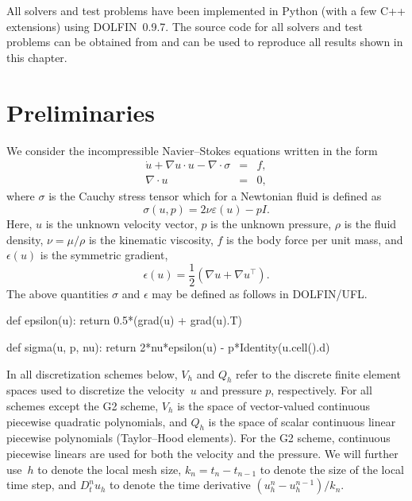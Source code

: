 All solvers and test problems have been implemented in Python (with a
few C++ extensions) using DOLFIN~0.9.7. The source code for all
solvers and test problems can be obtained from
 and can be used to reproduce all
results shown in this chapter.

\section{Preliminaries}

We consider the incompressible Navier--Stokes equations written in the
form
\begin{eqnarray}
  \label{eq:ns,mom}
  \dot{u} + \nabla u \cdot u - \nabla \cdot \sigma  &=& f, \\
  \label{eq:ns,con}
  \nabla \cdot u &=& 0,
\end{eqnarray}
where $\sigma$ is the Cauchy stress tensor which for a Newtonian fluid
is defined as
\begin{equation*}
  \sigma(u,p) = 2\nu\varepsilon(u) - pI.
\end{equation*}
Here, $u$ is the unknown velocity vector, $p$ is the unknown pressure,
$\rho$ is the fluid density, $\nu = \mu / \rho$ is the kinematic
viscosity, $f$ is the body force per unit mass, and $\epsilon(u)$ is
the symmetric gradient,
\begin{equation*}
  \epsilon(u) = \frac{1}{2} (\nabla u + \nabla u^{\top}).
\end{equation*}
The above quantities $\sigma$ and $\epsilon$ may be defined as follows
in DOLFIN/UFL.
\begin{python}
def epsilon(u):
    return 0.5*(grad(u) + grad(u).T)
\end{python}
\begin{python}
def sigma(u, p, nu):
    return 2*nu*epsilon(u) - p*Identity(u.cell().d)
\end{python}

In all discretization schemes below, $V_h$ and $Q_h$ refer to the
discrete finite element spaces used to discretize the velocity~$u$ and
pressure $p$, respectively. For all schemes except the G2 scheme,
$V_h$ is the space of vector-valued continuous piecewise quadratic
polynomials, and $Q_h$ is the space of scalar continuous linear
piecewise polynomials (Taylor--Hood elements). For the G2 scheme,
continuous piecewise linears are used for both the velocity and the
pressure. We will further use~$h$ to denote the local mesh size, $k_n
= t_n - t_{n-1}$ to denote the size of the local time step, and $D^n_t
u_h$ to denote the time derivative $(u_h^n - u_h^{n-1})/k_n$.

